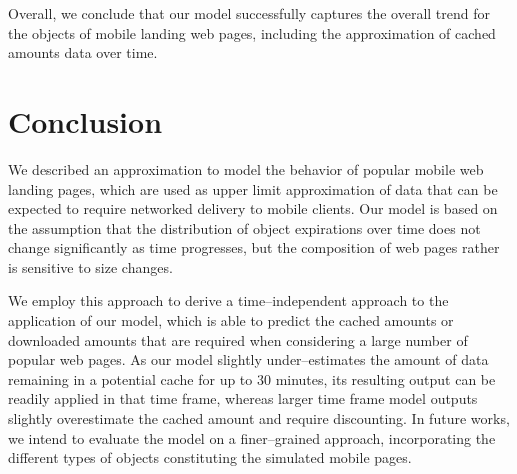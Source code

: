 Overall, we conclude that our model successfully captures the overall trend for the objects of mobile landing web pages, including the approximation of cached amounts data over time. 

\section{Conclusion}
\label{s:conc}
We described an approximation to model the behavior of popular mobile web landing pages, which are used as upper limit approximation of data that can be expected to require networked delivery to mobile clients.
Our model is based on the assumption that the distribution of object expirations over time does not change significantly as time progresses, but the composition of web pages rather is sensitive to size changes.

We employ this approach to derive a time--independent approach to the application of our model, which is able to predict the cached amounts or downloaded amounts that are required when considering a large number of popular web pages.
As our model slightly under--estimates the amount of data remaining in a potential cache for up to 30 minutes, its resulting output can be readily applied in that time frame, whereas larger time frame model outputs slightly overestimate the cached amount and require discounting.
In future works, we intend to evaluate the model on a finer--grained approach, incorporating the different types of objects constituting the simulated mobile pages.